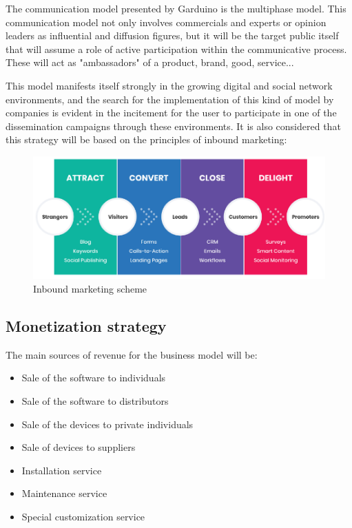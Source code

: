 \documentclass[11pt,a4paper]{article}
\begin{document}
\vspace{0.6in}
The communication model presented by Garduino is the multiphase model. This communication model not only involves commercials and experts or opinion leaders as influential and diffusion figures, but it will be the target public itself that will assume a role of active participation within the communicative process. These will act as "ambassadors" of a product, brand, good, service...\\ 

\newpage

This model manifests itself strongly in the growing digital and social network environments, and the search for the implementation of this kind of model by companies is evident in the incitement for the user to participate in one of the dissemination campaigns through these environments. It is also considered that this strategy will be based on the principles of inbound marketing:\\
\begin{figure}[hbtp]
\centering
\includegraphics[scale=1]{figures/marketing.png}
\caption{Inbound marketing scheme}
\end{figure}

\subsection{Monetization strategy}
The main sources of revenue for the business model will be: 
\begin{itemize}
\item Sale of the software to individuals
\item Sale of the software to distributors
\item Sale of the devices to private individuals
\item Sale of devices to suppliers
\item Installation service
\item Maintenance service
\item Special customization service
\end{itemize}
\end{document}
